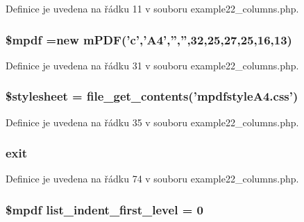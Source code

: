 Definice je uvedena na řádku 11 v souboru example22\-\_\-columns.\-php.

\hypertarget{example22__columns_8php_ad028f81910d6cbab9b184d2214b3a8f8}{
\subsubsection[{\$mpdf}]{\setlength{\rightskip}{0pt plus 5cm}\$mpdf =new {\bf m\-P\-D\-F}('c','A4','','',32,25,27,25,16,13)}}\label{example22__columns_8php_ad028f81910d6cbab9b184d2214b3a8f8}


Definice je uvedena na řádku 31 v souboru example22\-\_\-columns.\-php.

\hypertarget{example22__columns_8php_a19e5cf73e817c55a49205e6ec78c88a8}{
\subsubsection[{\$stylesheet}]{\setlength{\rightskip}{0pt plus 5cm}\$stylesheet = file\-\_\-get\-\_\-contents('mpdfstyle\-A4.\-css')}}\label{example22__columns_8php_a19e5cf73e817c55a49205e6ec78c88a8}


Definice je uvedena na řádku 35 v souboru example22\-\_\-columns.\-php.

\hypertarget{example22__columns_8php_a6733eb5f605d09eaede9845835d71c4e}{
\subsubsection[{exit}]{\setlength{\rightskip}{0pt plus 5cm}exit}}\label{example22__columns_8php_a6733eb5f605d09eaede9845835d71c4e}


Definice je uvedena na řádku 74 v souboru example22\-\_\-columns.\-php.

\hypertarget{example22__columns_8php_a8780612514d14375709d0685d189579e}{
\subsubsection[{list\-\_\-indent\-\_\-first\-\_\-level}]{\setlength{\rightskip}{0pt plus 5cm}\$mpdf list\-\_\-indent\-\_\-first\-\_\-level = 0}}\label{example22__columns_8php_a8780612514d14375709d0685d189579e}


